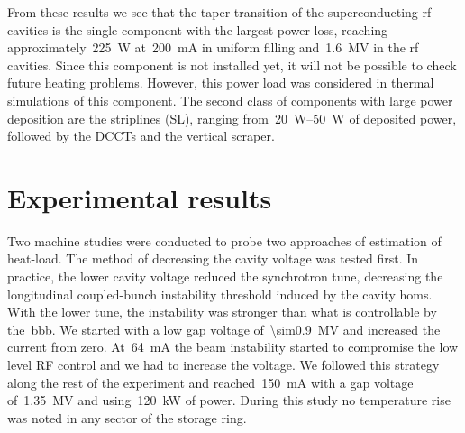 \documentclass
[
    a4paper,
]{jacow}
\begin{document}
    From these results we see that the taper transition of the superconducting rf cavities is the single component with the largest power loss, reaching approximately~\SI{225}{\watt} at~\SI{200}{\milli\ampere} in uniform filling and~\SI{1.6}{\mega\volt} in the rf cavities. Since this component is not installed yet, it will not be possible to check future heating problems. However, this power load was considered in thermal simulations of this component. The second class of components with large power deposition are the striplines (SL), ranging from~\SIrange{20}{50}{\watt} of deposited power, followed by the DCCTs and the vertical scraper.

\section{Experimental results}

    Two machine studies were conducted to probe two approaches of estimation of heat-load. The method of decreasing the cavity voltage was tested first. In practice, the lower cavity voltage reduced the synchrotron tune, decreasing the longitudinal coupled-bunch instability threshold induced by the cavity \glspl{hom}. With the lower tune, the instability was stronger than what is controllable by the~\gls{bbb}. We started with a low gap voltage of~\SI{\sim0.9}{\mega\volt} and increased the current from zero. At~\SI{64}{\milli\ampere} the beam instability started to compromise the low level RF control and we had to increase the voltage. We followed this strategy along the rest of the experiment and reached~\SI{150}{\milli\ampere} with a gap voltage of~\SI{1.35}{\mega\volt} and using~\SI{120}{\kilo\watt} of power. During this study no temperature rise was noted in any sector of the storage ring.
    
\end{document}
